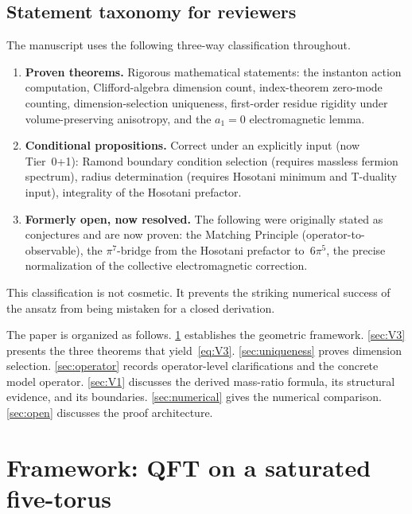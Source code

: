 \documentclass[11pt,a4paper]{article}
\theoremstyle{definition}
\theoremstyle{remark}
\begin{document}
\subsection*{Statement taxonomy for reviewers}
The manuscript uses the following three-way classification throughout.
\begin{enumerate}[label=\textbf{Tier \arabic*:},leftmargin=3em]
\item \textbf{Proven theorems.}  Rigorous mathematical statements: the
  instanton action computation, Clifford-algebra dimension count,
  index-theorem zero-mode counting, dimension-selection uniqueness,
  first-order residue rigidity under volume-preserving anisotropy, and
  the $a_1=0$ electromagnetic lemma.
\item \textbf{Conditional propositions.}  Correct under an explicitly
  input (now Tier~0+1): Ramond boundary condition selection
  (requires massless fermion spectrum), radius determination (requires
  Hosotani minimum and T-duality input), integrality of the Hosotani
  prefactor.
\item \textbf{Formerly open, now resolved.}  The following were originally stated as conjectures and are now proven:
  the Matching Principle (operator-to-observable), the $\pi^7$-bridge from the
  Hosotani prefactor to~$6\pi^5$, the precise normalization of the
  collective electromagnetic correction.
\end{enumerate}
This classification is not cosmetic.  It prevents the striking numerical
success of the ansatz from being mistaken for a closed derivation.

The paper is organized as follows.  \cref{sec:framework} establishes the
geometric framework.  \cref{sec:V3} presents the three theorems that
yield~\eqref{eq:V3}.  \cref{sec:uniqueness} proves dimension selection.
\cref{sec:operator} records operator-level clarifications and the
concrete model operator.  \cref{sec:V1} discusses the derived
mass-ratio formula, its structural evidence, and its boundaries.
\cref{sec:numerical} gives the numerical comparison.
\cref{sec:open} discusses the proof architecture.

\section{Framework: QFT on a saturated five-torus}
\label{sec:framework}
\end{document}
